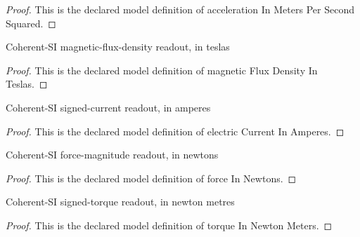 \begin{proof}
  This is the declared model definition of acceleration In Meters Per Second Squared.
\end{proof}
\begin{definition}
  \label{def:physics:phyx-mini-0951:phyxminiproblems-problemphyxmini0951-magneticfluxdensityinteslas}
  Coherent-SI magnetic-flux-density readout, in teslas
\end{definition}
\begin{proof}
  This is the declared model definition of magnetic Flux Density In Teslas.
\end{proof}
\begin{definition}
  \label{def:physics:phyx-mini-0951:phyxminiproblems-problemphyxmini0951-electriccurrentinamperes}
  Coherent-SI signed-current readout, in amperes
\end{definition}
\begin{proof}
  This is the declared model definition of electric Current In Amperes.
\end{proof}
\begin{definition}
  \label{def:physics:phyx-mini-0951:phyxminiproblems-problemphyxmini0951-forceinnewtons}
  Coherent-SI force-magnitude readout, in newtons
\end{definition}
\begin{proof}
  This is the declared model definition of force In Newtons.
\end{proof}
\begin{definition}
  \label{def:physics:phyx-mini-0951:phyxminiproblems-problemphyxmini0951-torqueinnewtonmeters}
  Coherent-SI signed-torque readout, in newton metres
\end{definition}
\begin{proof}
  This is the declared model definition of torque In Newton Meters.
\end{proof}
